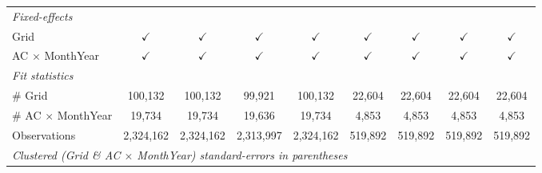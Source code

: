\begin{table}[htbp]
\begin{tabular}{lcccccccc}
      \midrule
      \emph{Fixed-effects}\\
      Grid                                   & $\checkmark$  & $\checkmark$            & $\checkmark$  & $\checkmark$  & $\checkmark$  & $\checkmark$            & $\checkmark$  & $\checkmark$\\   
      AC $\times$ MonthYear                  & $\checkmark$  & $\checkmark$            & $\checkmark$  & $\checkmark$  & $\checkmark$  & $\checkmark$            & $\checkmark$  & $\checkmark$\\   
      \midrule
      \emph{Fit statistics}\\
      \# Grid                                & 100,132       & 100,132                 & 99,921        & 100,132       & 22,604        & 22,604                  & 22,604        & 22,604\\  
      \# AC $\times$ MonthYear               & 19,734        & 19,734                  & 19,636        & 19,734        & 4,853         & 4,853                   & 4,853         & 4,853\\  
      Observations                           & 2,324,162     & 2,324,162               & 2,313,997     & 2,324,162     & 519,892       & 519,892                 & 519,892       & 519,892\\  
      \midrule \midrule
      \multicolumn{9}{l}{\emph{Clustered (Grid \& AC $\times$ MonthYear) standard-errors in parentheses}}\\
   \end{tabular}
\end{table}


